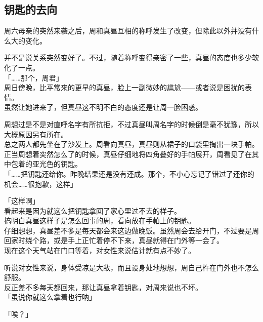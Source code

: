 \subsection{钥匙的去向}

周六母亲的突然来袭之后，周和真昼互相的称呼发生了改变，但除此以外并没有什么大的变化。

并不是说关系突然变好了。不过，随着称呼变得亲密了一些，真昼的态度也多少软化了一点。\\

「……那个，周君」\\

周日傍晚，比平常来的更早的真昼，脸上一副微妙的尴尬——或者说是困扰的表情。\\

虽然让她进来了，但真昼这不明不白的态度还是让周一脸困惑。

周想过是不是对直呼名字有所抗拒，不过真昼叫周名字的时候倒是毫不犹豫，所以大概原因另有所在。\\

总之两人都先坐在了沙发上。周看向真昼，真昼则从裙子的口袋里掏出一块手帕。\\

正当周想着突然怎么了的时候，真昼仔细地将四角叠好的手帕展开，周看见了在其中包着的亚光色的钥匙。\\

「……把钥匙还给你。昨晚结果还是没有还成。那个，不小心忘记了错过了还你的机会……很抱歉，这样」

「这样啊」\\

看起来是因为就这么把钥匙拿回了家心里过不去的样子。\\

搞明白真昼这样子是怎么回事的周，看向放在手帕上的钥匙。\\

仔细想想，真昼差不多是每天都会来这边做晚饭。虽然周会去给开门，不过要是周回家时绕个路，或是手上正忙着停不下来，真昼就得在门外等一会了。\\

现在这个天气站在门口等着，对女性来说估计就有点不妙了。

听说对女性来说，身体受凉是大敌，而且设身处地想想，周自己杵在门外也不怎么舒服。\\

反正差不多每天都回来，那让真昼拿着钥匙，对周来说也不坏。\\

「虽说你就这么拿着也行呐」

「唉？」

